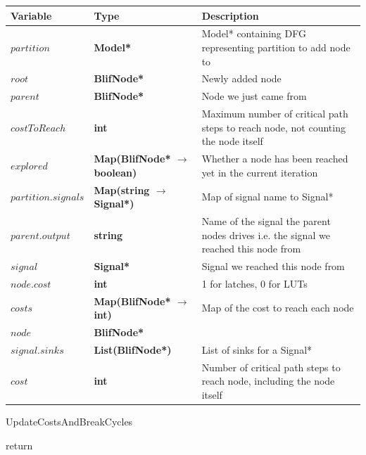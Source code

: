 \documentclass[12pt,final,oneside]{article} %
\begin{document}
\begin{algorithm}
    \begin{center}
        \begin{tabularx}{\linewidth}{llX}
        \toprule
        Variable & Type & Description\\
        \midrule
        $partition$ &\bf  Model* & Model* containing DFG representing partition to add node to\\
        $root$ &\bf  BlifNode* & Newly added node\\
        $parent$ &\bf  BlifNode* & Node we just came from\\
        $costToReach$ &\bf  int & Maximum number of critical path steps to reach node, not counting the node itself \\
        $explored$ &\bf  Map(BlifNode* $\to$ boolean) & Whether a node has been reached yet in the current iteration \\ 
        $partition.signals$ &\bf  Map(string $\to$ Signal*) & Map of signal name to Signal* \\
        $parent.output$ &\bf string & Name of the signal the parent nodes drives i.e. the signal we reached this node from\\
        $signal$ & \bf Signal* & Signal we reached this node from\\
        $node.cost$ &\bf  int & 1 for latches, 0 for LUTs \\
        $costs$ &\bf  Map(BlifNode* $\to$ int) & Map of the cost to reach each node \\
        $node$ &\bf  BlifNode* & \\
        $signal.sinks$ &\bf  List(BlifNode*) & List of sinks for a Signal* \\
        $cost$ &\bf  int & Number of critical path steps to reach node, including the node itself \\
        \bottomrule
        \end{tabularx}
    \end{center}
   \caption{UpdateCostsAndBreakCycles}\label{updatecosts}
   \begin{algorithmic}[1]
       
            \State return
         \EndIf
          

\end{algorithmic}
\end{algorithm}
\end{document}
